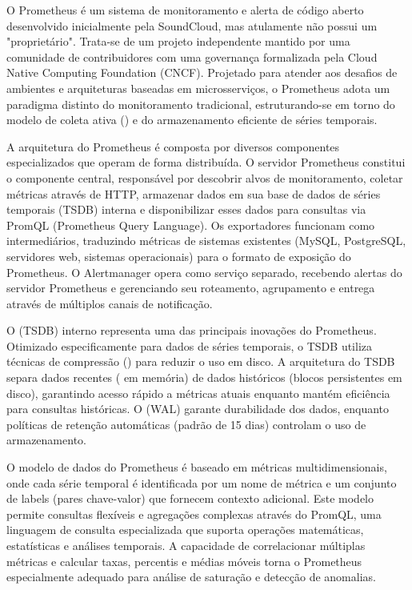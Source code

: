 O Prometheus \citep{prometheus2025} é um sistema de monitoramento e alerta de código aberto desenvolvido inicialmente pela SoundCloud, mas atulamente não possui um "proprietário". Trata-se de um projeto independente mantido por uma comunidade de contribuidores com uma governança formalizada pela Cloud Native Computing Foundation (CNCF). Projetado para atender aos desafios de ambientes  e arquiteturas baseadas em microsserviços, o Prometheus adota um paradigma distinto do monitoramento tradicional, estruturando-se em torno do modelo de coleta ativa () e do armazenamento eficiente de séries temporais.

A arquitetura do Prometheus é composta por diversos componentes especializados que operam de forma distribuída. O servidor Prometheus constitui o componente central, responsável por descobrir alvos de monitoramento, coletar métricas através de  HTTP, armazenar dados em sua base de dados de séries temporais (TSDB) interna e disponibilizar esses dados para consultas via PromQL (Prometheus Query Language). Os exportadores funcionam como intermediários, traduzindo métricas de sistemas existentes (MySQL, PostgreSQL, servidores web, sistemas operacionais) para o formato de exposição do Prometheus. O Alertmanager opera como serviço separado, recebendo alertas do servidor Prometheus e gerenciando seu roteamento, agrupamento e entrega através de múltiplos canais de notificação.

O  (TSDB) interno representa uma das principais inovações do Prometheus. Otimizado especificamente para dados de séries temporais, o TSDB utiliza técnicas de compressão () para reduzir o uso em disco. A arquitetura do TSDB separa dados recentes ( em memória) de dados históricos (blocos persistentes em disco), garantindo acesso rápido a métricas atuais enquanto mantém eficiência para consultas históricas. O  (WAL) garante durabilidade dos dados, enquanto políticas de retenção automáticas (padrão de 15 dias) controlam o uso de armazenamento.

O modelo de dados do Prometheus é baseado em métricas multidimensionais, onde cada série temporal é identificada por um nome de métrica e um conjunto de labels (pares chave-valor) que fornecem contexto adicional. Este modelo permite consultas flexíveis e agregações complexas através do PromQL, uma linguagem de consulta especializada que suporta operações matemáticas, estatísticas e análises temporais. A capacidade de correlacionar múltiplas métricas e calcular taxas, percentis e médias móveis torna o Prometheus especialmente adequado para análise de saturação e detecção de anomalias.

